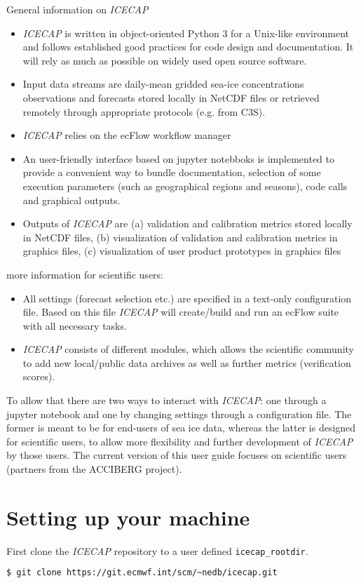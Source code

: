 \documentclass[DIV=10, parskip=full]{scrreprt}
\newcommand{\ice}{\textit{ICECAP}\xspace}
\newcommand{\notimplement}[1]{#1}
\begin{document}
General information on \ice
\begin{itemize}
	\item \ice is written in object-oriented Python 3 for a Unix-like environment and follows established good practices for code design and documentation. It will rely as much as possible on widely used open source software.
	\item Input data streams are daily-mean gridded sea-ice concentrations observations and forecasts stored locally in NetCDF files or retrieved remotely through appropriate protocols (e.g. from C3S).
	\item \ice relies on the ecFlow workflow manager
	\item An user-friendly interface based on jupyter notebboks is implemented to provide a convenient way to bundle documentation, selection of some execution parameters (such as geographical regions and seasons), code calls and graphical outputs.
	\item Outputs of \ice are (a) validation and calibration metrics stored locally in NetCDF files, (b) visualization of validation and calibration metrics in graphics files, (c) visualization of user product prototypes in graphics files
\end{itemize}

more information for scientific users:
\begin{itemize}
	\item All settings (forecast selection etc.) are specified in a text-only configuration file. Based on this file \ice will create/build and run an ecFlow suite  with all necessary tasks.
	\item \ice consists of different modules, which allows the scientific community to add new local/public data archives as well as further metrics (verification scores).
\end{itemize}

To allow that there are two ways to interact with \ice: one through a \notimplement{jupyter notebook} and one by changing settings through a configuration file. The former is meant to be for end-users of sea ice data, whereas the latter is designed for scientific users, to allow more flexibility and further development of \ice by those users.  \notimplement{The current version of this user guide focuses on scientific users (partners from the ACCIBERG project)}. 



\section{Setting up your machine}\label{sec:setup}
First clone the \ice repository to a user defined \texttt{icecap\_rootdir}.
\begin{lstlisting}[language=bash, float]
	$ git clone https://git.ecmwf.int/scm/~nedb/icecap.git
\end{lstlisting}
\end{document}
